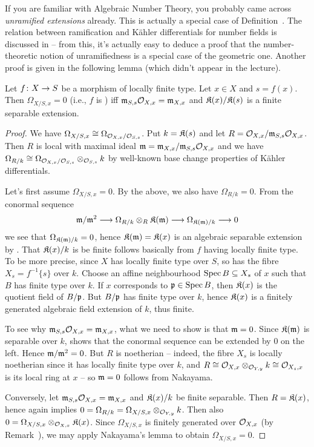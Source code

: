 \documentclass[a4paper,parskip=half,numbers=enddot, DIV=12]{scrreprt}
\begin{document}
If you are familiar with Algebraic Number Theory, you probably came across \emph{unramified extensions} already. This is actually a special case of Definition~. The relation between ramification and Kähler differentials for number fields is discussed in \cite[Ch.\:III \S2]{NEUKIRCH} -- from this, it's actually easy to deduce a proof that the number-theoretic notion of unramifiedness is a special case of the geometric one. Another proof is given in the following lemma (which didn't appear in the lecture).
\begin{lem}
	Let $f\colon X\morphism S$ be a morphism of locally finite type. Let $x\in X$ and $s=f(x)$. Then $\Omega_{X/S,x}=0$ (i.e., $f$ is ) iff $\mathfrak{m}_{S,s}\mathcal{O}_{X,x}=\mathfrak{m}_{X,x}$ and $\mathfrak{K}(x)/\mathfrak{K}(s)$ is a finite separable extension.
\end{lem}
\begin{proof}
	We have $\Omega_{X/S,x}\cong\Omega_{\mathcal{O}_{X,x}/\mathcal{O}_{S,s}}$. Put $k=\mathfrak{K}(s)$ and let $R=\mathcal{O}_{X,x}/\mathfrak{m}_{S,s}\mathcal{O}_{X,x}$. Then $R$ is local with maximal ideal $\mathfrak{m}=\mathfrak{m}_{X,x}/\mathfrak{m}_{S,s}\mathcal{O}_{X,x}$ and we have $\Omega_{R/k}\cong \Omega_{\mathcal{O}_{X,x}/\mathcal{O}_{S,s}}\otimes_{\mathcal{O}_{S,s}}k$ by well-known base change properties of Kähler differentials.
	
	Let's first assume $\Omega_{X/S,x}=0$. By the above, we also have $\Omega_{R/k}=0$. From the conormal sequence
	\begin{align}\lbl{eq:conormalSequence}
		\mm/\mm^2\morphism\Omega_{R/k}\otimes_R\KK(\mm)\morphism\Omega_{\KK(\mm)/k}\morphism 0
	\end{align}
	we see that $\Omega_{\mathfrak{K}(\mathfrak{m})/k}=0$, hence $\mathfrak{K}(\mathfrak{m})=\mathfrak{K}(x)$ is an algebraic separable extension by \cite[Corollary~16.17]{eisenbudCommAlg}. That $\mathfrak{K}(x)/k$ is be finite follows basically from $f$ having locally finite type. To be more precise, since $X$ has locally finite type over $S$, so has the fibre $X_s=f^{-1}\{s\}$ over $k$. Choose an affine neighbourhood $\operatorname{Spec} B\subseteq X_s$ of $x$ such that $B$ has finite type over $k$. If $x$ corresponds to $\mathfrak{p}\in\operatorname{Spec} B$, then $\mathfrak{K}(x)$ is the quotient field of $B/\mathfrak{p}$. But $B/\mathfrak{p}$ has finite type over $k$, hence $\mathfrak{K}(x)$ is a finitely generated algebraic field extension of $k$, thus finite.
	
	To see why $\mathfrak{m}_{S,s}\mathcal{O}_{X,x}=\mathfrak{m}_{X,x}$, what we need to show is that $\mathfrak{m}=0$. Since $\mathfrak{K}(\mathfrak{m})$ is separable over $k$, \cite[Lemma~1.6.1]{alg2} shows that the conormal sequence  can be extended by $0$ on the left. Hence $\mathfrak{m}/\mathfrak{m}^2=0$. But $R$ is noetherian -- indeed, the fibre $X_s$ is locally noetherian since it has locally finite type over $k$, and $R\cong \mathcal{O}_{X,x}\otimes_{\mathcal{O}_{Y,y}}k\cong \mathcal{O}_{X_s,x}$ is its local ring at $x$ -- so $\mathfrak{m}=0$ follows from Nakayama.
	
	Conversely, let $\mathfrak{m}_{S,s}\mathcal{O}_{X,x}=\mathfrak{m}_{X,x}$ and $\mathfrak{K}(x)/k$ be finite separable. Then $R=\mathfrak{K}(x)$, hence \cite[Corollary~16.17]{eisenbudCommAlg} again implies $0=\Omega_{R/k}=\Omega_{X/S,x}\otimes_{\mathcal{O}_{Y,y}}k$. Then also $0=\Omega_{X/S,x}\otimes_{\mathcal{O}_{X,x}}\mathfrak{K}(x)$. Since $\Omega_{X/S,x}$ is finitely generated over $\mathcal{O}_{X,x}$ (by Remark~), we may apply Nakayama's lemma to obtain $\Omega_{X/S,x}=0$.
\end{proof}
\end{document}
